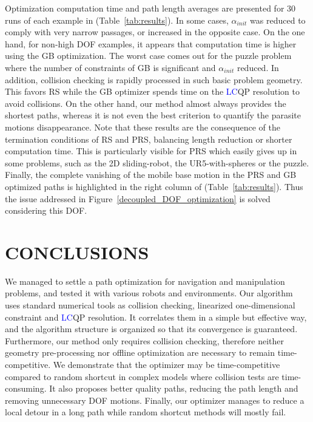\documentclass{tADR2e}
\begin{document}
Optimization computation time and path length averages are presented for 30 runs of 
each example in (Table~\ref{tab:results}). In some cases, $\alpha_{init}$ was 
reduced to comply with very narrow passages, or increased in the opposite case. 
On the one hand, for non-high DOF examples, it appears that computation time is higher using the GB 
optimization. The worst case comes out for the puzzle problem where the number of 
constraints of GB is significant and $\alpha_{init}$ reduced. 
In addition, collision checking is rapidly processed in such basic problem geometry. This favors RS while the GB optimizer spends time on the \textcolor{blue}{LC}QP resolution to avoid collisions.
On the other hand, our method almost always provides the shortest paths, whereas it 
is not even the best criterion to quantify the parasite motions disappearance.
Note that these results are the consequence of the termination conditions of RS and PRS, balancing length reduction or shorter computation time. 
This is particularly visible for PRS which 
easily gives up in some problems, such as the 2D sliding-robot, the 
UR5-with-spheres or the puzzle.
Finally, the complete vanishing of the mobile base motion in the PRS and GB 
optimized paths is highlighted in the right column of (Table~\ref{tab:results}). 
Thus the issue addressed in Figure~\ref{decoupled_DOF_optimization} is 
solved considering this DOF.



\section{CONCLUSIONS}
We managed to settle a path optimization for navigation and manipulation problems, and tested it with various robots and environments. Our algorithm uses standard 
numerical tools as collision checking, linearized one-dimensional constraint
and \textcolor{blue}{LC}QP resolution. It correlates them in a 
simple but effective way, and the algorithm structure is organized so that its 
convergence is guaranteed. Furthermore, 
our method only requires collision checking, therefore neither 
geometry pre-processing nor 
offline optimization are necessary to remain time-competitive. We demonstrate 
that the optimizer may be 
time-competitive compared to random shortcut in complex models where collision tests 
are time-consuming. 
It also proposes better quality paths, reducing the path length and removing 
unnecessary DOF motions. 
Finally, our optimizer manages to reduce a local detour in a long path while random 
shortcut methods will mostly fail.
\end{document}
